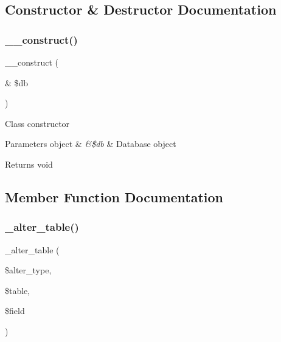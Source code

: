 \subsection{Constructor \& Destructor Documentation}
\mbox{\label{class_c_i___d_b__forge_aaf2ef772755ec6f361d44e16cc9ffd69}} 
\subsubsection{\texorpdfstring{\+\_\+\+\_\+construct()}{\_\_construct()}}
{\footnotesize\ttfamily \+\_\+\+\_\+construct (\begin{DoxyParamCaption}\item[{\&}]{\$db }\end{DoxyParamCaption})}

Class constructor


\begin{DoxyParams}[1]{Parameters}
object & {\em \&\$db} & Database object \\
\hline
\end{DoxyParams}
\begin{DoxyReturn}{Returns}
void 
\end{DoxyReturn}


\subsection{Member Function Documentation}
\mbox{\label{class_c_i___d_b__forge_a41c6cae02f2fda8b429ad0afb9509426}} 
\subsubsection{\texorpdfstring{\+\_\+alter\+\_\+table()}{\_alter\_table()}}
{\footnotesize\ttfamily \+\_\+alter\+\_\+table (\begin{DoxyParamCaption}\item[{}]{\$alter\+\_\+type,  }\item[{}]{\$table,  }\item[{}]{\$field }\end{DoxyParamCaption})\hspace{0.3cm}{\ttfamily [protected]}}

